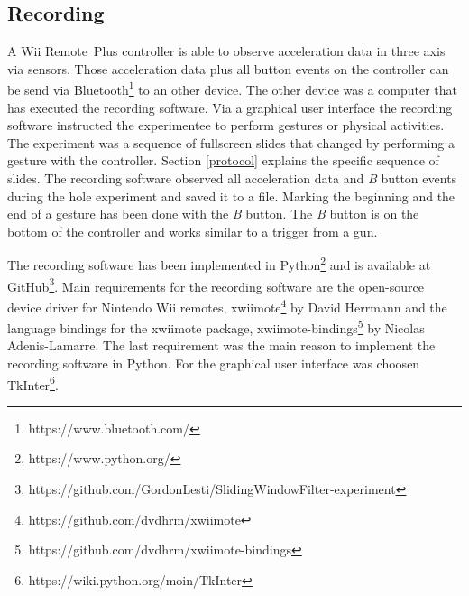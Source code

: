 \subsection{Recording}
A Wii Remote\texttrademark~Plus controller is able to observe acceleration data in three axis via sensors. Those
acceleration data plus all button events on the controller can be send via
Bluetooth\footnote{https://www.bluetooth.com/} to an other device. The other device was a computer that has executed the
recording software. Via a graphical user interface the recording software instructed the experimentee to perform
gestures or physical activities. The experiment was a sequence of fullscreen slides that changed by performing a gesture
with the controller. Section \ref{protocol} explains the specific sequence of slides. The recording software observed
all acceleration data and \textit{B} button events during the hole experiment and saved it to a file. Marking the
beginning and the end of a gesture has been done with the \textit{B} button. The \textit{B} button is on the bottom of
the controller and works similar to a trigger from a gun.

The recording software has been implemented in Python\footnote{https://www.python.org/} and is available at
GitHub\footnote{https://github.com/GordonLesti/SlidingWindowFilter-experiment}. Main requirements for the recording
software are the open-source device driver for Nintendo Wii remotes,
xwiimote\footnote{https://github.com/dvdhrm/xwiimote} by David Herrmann and the language bindings for the xwiimote
package, xwiimote-bindings\footnote{https://github.com/dvdhrm/xwiimote-bindings} by Nicolas Adenis-Lamarre. The last
requirement was the main reason to implement the recording software in Python. For the graphical user interface was
choosen TkInter\footnote{https://wiki.python.org/moin/TkInter}.


